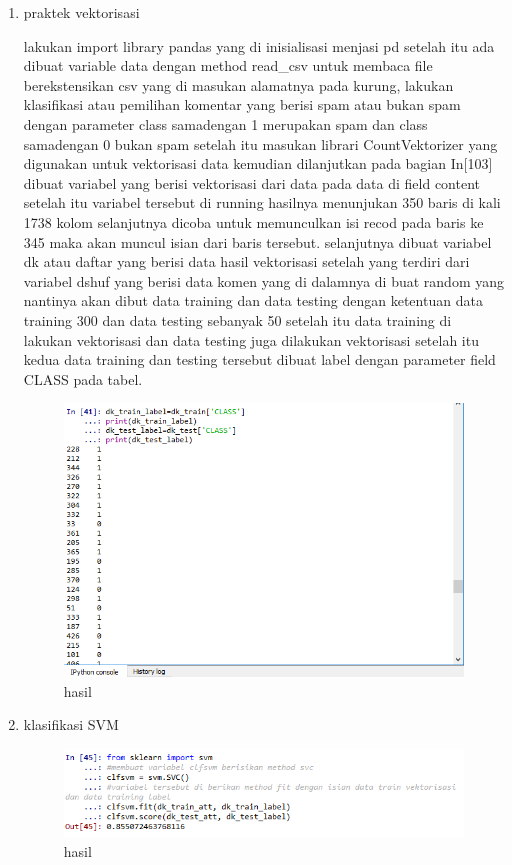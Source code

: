 \begin{enumerate}
\item praktek vektorisasi
	
\par lakukan import library pandas yang di inisialisasi menjasi pd setelah itu ada dibuat variable data dengan method read\_csv untuk membaca file berekstensikan csv yang di masukan alamatnya pada kurung, lakukan klasifikasi atau pemilihan komentar yang berisi spam atau bukan spam dengan parameter class samadengan 1 merupakan spam dan class samadengan 0 bukan spam setelah itu masukan librari CountVektorizer yang digunakan untuk vektorisasi data kemudian dilanjutkan pada bagian In[103] dibuat variabel yang berisi vektorisasi dari data pada data di field content setelah itu variabel tersebut di running hasilnya menunjukan 350 baris di kali 1738 kolom selanjutnya dicoba untuk memunculkan isi recod pada baris ke 345 maka akan muncul isian dari baris tersebut. selanjutnya dibuat variabel dk atau daftar yang berisi data hasil vektorisasi setelah yang terdiri dari variabel dshuf yang berisi data komen yang di dalamnya di buat random yang nantinya akan dibut data training dan data testing dengan ketentuan data training 300 dan data testing sebanyak 50 setelah itu data training di lakukan vektorisasi dan data testing juga dilakukan vektorisasi setelah itu kedua data training dan testing tersebut dibuat label dengan parameter field CLASS pada tabel.
\begin{figure}[H]
\centering
\includegraphics[scale=0.7]{figures/1174057/chapter4/8.PNG}
\caption{hasil}
\label{Praktek no 3}
\end{figure}		

\item klasifikasi SVM

\begin{figure}[H]
\centering
\includegraphics[scale=0.7]{figures/1174057/chapter4/9.PNG}
\caption{hasil}
\label{Praktek no 4}
\end{figure}		


\end{enumerate}
